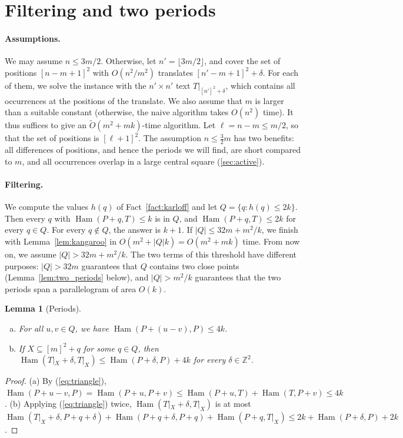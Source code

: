 \documentclass[11pt]{article}
\newtheorem{lemma}[theorem]{Lemma}
\theoremstyle{definition}
\newcommand{\Z}{\mathbb{Z}}
\newcommand{\tO}{\tilde{O}}
\renewcommand{\O}{O}
\DeclareMathOperator{\Ham}{Ham}
\newcommand{\abs}[1]{\lvert #1 \rvert}
\begin{document}
\section{Filtering and two periods}
\label{sec:periods}

\paragraph{Assumptions.} We may assume $n \le 3m/2$.
Otherwise, let $n' = \lfloor 3m/2 \rfloor$, and cover the set of positions $[n-m+1]^2$ with $\O(n^2/m^2)$ translates $[n'-m+1]^2 + \delta$.
For each of them, we solve the instance with the $n' \times n'$ text $T|_{[n']^2 + \delta}$, which contains all occurrences at the positions of the translate.
We also assume that $m$ is larger than a suitable constant (otherwise, the naive algorithm takes $\O(n^2)$ time).
It thus suffices to give an $\tO(m^2 + mk)$-time algorithm.
Let $\ell = n - m \le m/2$, so that the set of positions is $[\ell+1]^2$.
The assumption $n \le \frac32 m$ has two benefits: all differences of positions, and hence the periods we will find, are short compared to $m$, and all occurrences overlap in a large central square (\autoref{sec:active}).

\paragraph{Filtering.} We compute the values $h(q)$ of Fact~\ref{fact:karloff} and let $Q = \{q : h(q) \le 2k\}$.
Then every $q$ with $\Ham(P+q,T) \le k$ is in $Q$, and $\Ham(P+q,T) \le 2k$ for every $q \in Q$.
For every $q \notin Q$, the answer is $k+1$.
If $\abs{Q} \le 32m + m^2/k$, we finish with Lemma~\ref{lem:kangaroo} in $\O(m^2 + \abs{Q}k) = \O(m^2 + mk)$ time.
From now on, we assume $\abs{Q} > 32m + m^2/k$.
The two terms of this threshold have different purposes: $\abs{Q} > 32m$ guarantees that $Q$ contains two close points (Lemma~\ref{lem:two_periods} below), and $\abs{Q} > m^2/k$ guarantees that the two periods span a parallelogram of area $\O(k)$.

\begin{lemma}[Periods]\label{lem:period}
\begin{enumerate}[(a)]
\item For all $u, v \in Q$, we have $\Ham(P + (u - v), P) \le 4k$.
\item If $X \subseteq [m]^2 + q$ for some $q \in Q$, then $\Ham(T|_X + \delta, T|_X) \le \Ham(P + \delta, P) + 4k$ for every $\delta \in \Z^2$.
\end{enumerate}
\end{lemma}
\begin{proof}
(a) By (\ref{eq:triangle}), $\Ham(P+u-v, P) = \Ham(P+u, P+v) \le \Ham(P+u, T) + \Ham(T, P+v) \le 4k$.
(b) Applying (\ref{eq:triangle}) twice, $\Ham(T|_X + \delta, T|_X)$ is at most $\Ham(T|_X + \delta, P + q + \delta) + \Ham(P + q + \delta, P + q) + \Ham(P + q, T|_X) \le 2k + \Ham(P + \delta, P) + 2k$.
\end{proof}
\end{document}
